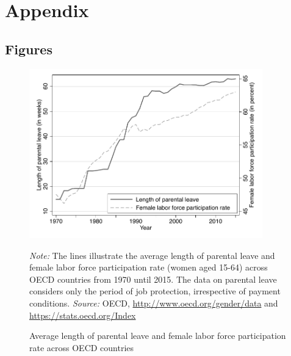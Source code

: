 \documentclass[a4paper ]{article}
\begin{document}
 


\newpage




\newpage
\appendix
\section{Appendix}
\subsection{Figures}
\renewcommand\thefigure{A\arabic{figure}}
\setcounter{figure}{0} 
\captionsetup[subfigure]{labelformat=parens}






\begin{figure}[p]
\centering
\includegraphics[width=0.9\textwidth]{../../analysis/graphs/SOEP/PL_OECD.pdf}
\caption{Average length of parental leave and female labor force participation rate across OECD countries}
\label{fig:PLOECD}
\begin{minipage}{\textwidth} %
{\footnotesize \textit{Note:} The lines illustrate the average length of parental leave and female labor force participation rate (women aged 15-64) across OECD countries from 1970 until 2015. The data on parental leave considers only the period of job protection, irrespective of payment conditions. \newline \textit{Source: }OECD, 
\href{http://www.oecd.org/gender/data/length-of-maternity-leave-parental-leave-and-paid-father-specific-leave.htm}{http://www.oecd.org/gender/data} and \href{https://stats.oecd.org/Index.aspx?DataSetCode=LFS_SEXAGE_I_R#}{https://stats.oecd.org/Index}\par}
\end{minipage}
\end{figure}
\end{document}
